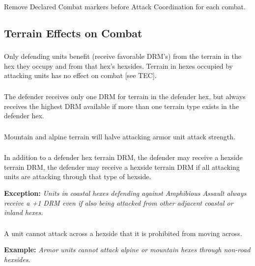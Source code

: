 \subsubsection{}
Remove Declared Combat markers before Attack Coordination for each combat.

\subsection{Terrain Effects on Combat}

\subsubsection{}
Only defending units benefit (receive favorable DRM's) from the terrain in the hex they occupy and from that hex's hexsides. Terrain in hexes occupied by attacking units has no effect on combat [see TEC].

\subsubsection{}
The defender receives only one DRM for terrain in the defender hex, but always receives the highest DRM available if more than one terrain type exists in the defender hex.

\subsubsection{}
Mountain and alpine terrain will halve attacking armor unit attack strength.

\subsubsection{}
In addition to a defender hex terrain DRM, the defender may receive a hexside terrain DRM, the defender may receive a hexside terrain DRM if all attacking units are attacking through that type of hexside.

\textbf{Exception:} \textit{Units in coastal hexes defending against Amphibious Assault always receive a +1 DRM even if also being attacked from other adjacent coastal or inland hexes.}

\subsubsection{}
A unit cannot attack across a hexside that it is prohibited from moving across.

\textbf{Example:} \textit{Armor units cannot attack alpine or mountain hexes through non-road hexsides}.

